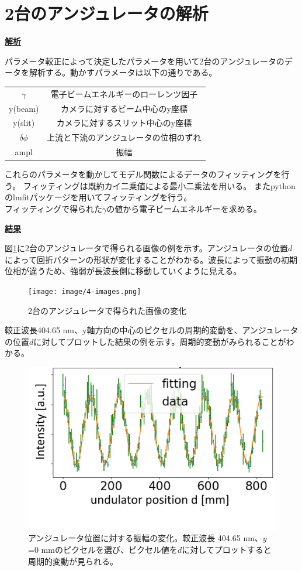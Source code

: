 \documentclass[a4paper,11pt,uplatex]{jsbook}
\begin{document}
\section{2台のアンジュレータの解析}
\noindent \textbf{\underline{解析}}\par
パラメータ較正によって決定したパラメータを用いて2台のアンジュレータのデータを解析する。動かすパラメータは以下の通りである。
\begin{table}[h]
\centering
\begin{tabular}{cc}
  $\gamma$ & 電子ビームエネルギーのローレンツ因子 \\
  y(beam) & カメラに対するビーム中心のy座標 \\
  y(slit) & カメラに対するスリット中心のy座標 \\
  $\delta \phi$ & 上流と下流のアンジュレータの位相のずれ\\
  ampl & 振幅
\end{tabular}
\end{table}

これらのパラメータを動かしてモデル関数によるデータのフィッティングを行う。
フィッティングは既約カイ二乗値による最小二乗法を用いる。
またpythonのlmfitパッケージ\cite{lmfit}を用いてフィッティングを行う。\\
フィッティングで得られた$\gamma$の値から電子ビームエネルギーを求める。

\noindent \textbf{\underline{結果}}\par
図\ref{images}に2台のアンジュレータで得られる画像の例を示す。アンジュレータの位置$d$によって回折パターンの形状が変化することがわかる。波長によって振動の初期位相が違うため、強弱が長波長側に移動していくように見える。
\begin{figure}[h]
  \centering
  \texttt{[image: image/4-images.png]}
  \caption[干渉による画像の変化]{2台のアンジュレータで得られた画像の変化}\label{images}
\end{figure}

較正波長404.65 nm、y軸方向の中心のピクセルの周期的変動を、アンジュレータの位置$d$に対してプロットした結果の例を示す。周期的変動がみられることがわかる。
\begin{figure}
  \centering
  \includegraphics[width=0.8\linewidth]{image/4-oscillation.png}
  \caption[アンジュレータ位置に対する振幅の変化]{アンジュレータ位置に対する振幅の変化。較正波長 404.65 nm、$y$ =0 mmのピクセルを選び、ピクセル値を$d$に対してプロットすると周期的変動が見られる。}
\end{figure}
\end{document}
